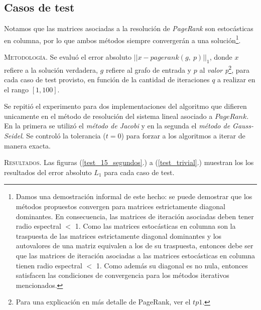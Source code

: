 \subsection{Casos de test}


Notamos que las matrices asociadas a la resolución de \textit{PageRank} son estocásticas en columna, por lo que ambos métodos siempre convergerán a una solución\footnote{Damos una demostración informal de este hecho: se puede demostrar que los métodos propuestos convergen para matrices estrictamente diagonal dominantes. En consecuencia, las matrices de iteración asociadas deben tener radio espectral $<$ 1. Como las matrices estocásticas en columna son la traspuesta de las matrices estrictamente diagonal dominantes y los autovalores de una matriz equivalen a los de su traspuesta, entonces debe ser que las matrices de iteración asociadas a las matrices estocásticas en columna tienen radio espectral $<$ 1. Como además su diagonal es no nula, entonces satisfacen las condiciones de convergencia para los métodos iterativos mencionados.}. 

\vspace{2em}
\noindent\textsc{Metodología}. Se evaluó el error absoluto $||x - pagerank(g,\ p)||_1$, donde $x$ refiere a la solución verdadera, $g$ refiere al grafo de entrada y $p$ al \textit{valor p}\footnote{Para una explicación en más detalle de PageRank, ver el $tp1$.}, para cada caso de test provisto, en función de la cantidad de iteraciones $q$ a realizar en el rango $[1, 100]$.

Se repitió el experimento para dos implementaciones del algoritmo que difieren unicamente en el método de resolución del sistema lineal asociado a $PageRank$. En la primera se utilizó el \textit{método de Jacobi} y en la segunda el \textit{método de Gauss-Seidel}. Se controló la tolerancia ($t = 0$) para forzar a los algoritmos a iterar de manera exacta. 

\vspace{2em}
\noindent\textsc{Resultados}. Las figuras (\ref{test_15_segundos}.) a (\ref{test_trivial}.) muestran los los resultados del error absoluto $L_1$ para cada caso de test.

